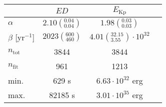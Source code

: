 \begin{tabular}{lccr}
\hline\hline
  &                               $ED$ &                                  $E_\mathrm{Kp}$ \\
\hline
$\alpha$            &  $2.10\left(^{0.04}_{0.04}\right)$ &                $1.98\left(^{0.03}_{0.03}\right)$ \\
$\beta$ [yr$^{-1}$] &    $2023\left(^{600}_{460}\right)$ &  $4.01\left(^{32.15}_{3.55}\right)\cdot 10^{32}$ \\
$n_\mathrm{tot}$    &                               3844 &                                             3844 \\
$n_\mathrm{fit}$    &                                961 &                                             1213 \\
min.                &                              629 s &                          $6.63\cdot 10^{32}$ erg \\
max.                &                            82185 s &                          $3.01\cdot 10^{35}$ erg \\
\hline

\end{tabular}
